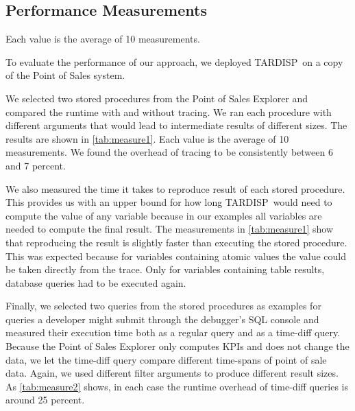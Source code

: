 \documentclass[english,conference]{IEEEtran}
\newcommand{\todo}[2][]{\pdfmargincomment[author={#1}]{#2}}
\newcommand{\tool}{TAR\-DISP}
\begin{document}
\subsection{Performance Measurements}

Each value is the average of 10 measurements.

To evaluate the performance of our approach, we deployed \tool\ on a copy of the Point of Sales system.

We selected two stored procedures from the Point of Sales Explorer and compared the runtime with and without tracing.
We ran each procedure with different arguments that would lead to intermediate results of different sizes.
The results are shown in \cref{tab:measure1}.
Each value is the average of 10 measurements.
We found the overhead of tracing to be consistently between 6 and 7 percent.


We also measured the time it takes to reproduce result of each stored procedure.
This provides us with an upper bound for how long \tool\ would need to compute the value of any variable because in our examples all variables are needed to compute the final result.
The measurements in \cref{tab:measure1} show that reproducing the result is slightly faster than executing the stored procedure.
This was expected because for variables containing atomic values the value could be taken directly from the trace.
Only for variables containing table results, database queries had to be executed again.

Finally, we selected two queries from the stored procedures as examples for queries a developer might submit through the debugger's SQL console and measured their execution time both as a regular query and as a time-diff query.
Because the Point of Sales Explorer only computes KPIs and does not change the data, we let the time-diff query compare different time-spans of point of sale data\todo{is this disclaimer needed?}.
Again, we used different filter arguments to produce different result sizes.
As \cref{tab:measure2} shows, in each case the runtime overhead of time-diff queries is around 25 percent.
\end{document}

